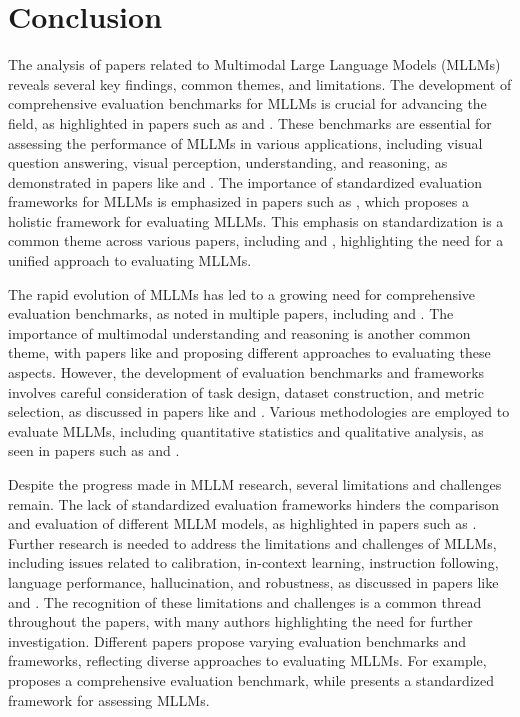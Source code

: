 \documentclass[conference]{IEEEtran}
\begin{document}
\section{Conclusion}
The analysis of papers related to Multimodal Large Language Models (MLLMs) reveals several key findings, common themes, and limitations. The development of comprehensive evaluation benchmarks for MLLMs is crucial for advancing the field, as highlighted in papers such as \cite{b1} and \cite{b2}. These benchmarks are essential for assessing the performance of MLLMs in various applications, including visual question answering, visual perception, understanding, and reasoning, as demonstrated in papers like \cite{b3} and \cite{b4}. The importance of standardized evaluation frameworks for MLLMs is emphasized in papers such as \cite{b5}, which proposes a holistic framework for evaluating MLLMs. This emphasis on standardization is a common theme across various papers, including \cite{b1} and \cite{b2}, highlighting the need for a unified approach to evaluating MLLMs.

The rapid evolution of MLLMs has led to a growing need for comprehensive evaluation benchmarks, as noted in multiple papers, including \cite{b3} and \cite{b4}. The importance of multimodal understanding and reasoning is another common theme, with papers like \cite{b1} and \cite{b2} proposing different approaches to evaluating these aspects. However, the development of evaluation benchmarks and frameworks involves careful consideration of task design, dataset construction, and metric selection, as discussed in papers like \cite{b5} and \cite{b6}. Various methodologies are employed to evaluate MLLMs, including quantitative statistics and qualitative analysis, as seen in papers such as \cite{b1} and \cite{b7}.

Despite the progress made in MLLM research, several limitations and challenges remain. The lack of standardized evaluation frameworks hinders the comparison and evaluation of different MLLM models, as highlighted in papers such as \cite{b5}. Further research is needed to address the limitations and challenges of MLLMs, including issues related to calibration, in-context learning, instruction following, language performance, hallucination, and robustness, as discussed in papers like \cite{b1} and \cite{b8}. The recognition of these limitations and challenges is a common thread throughout the papers, with many authors highlighting the need for further investigation. Different papers propose varying evaluation benchmarks and frameworks, reflecting diverse approaches to evaluating MLLMs. For example, \cite{b2} proposes a comprehensive evaluation benchmark, while \cite{b5} presents a standardized framework for assessing MLLMs.
\end{document}
